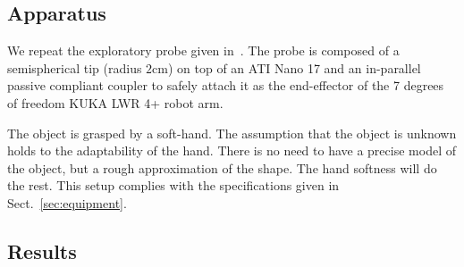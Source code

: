\subsection{Apparatus}
\label{sec:apparatus}

We repeat the exploratory probe given in~\citet{Rosales2014Active}. The probe is composed of a semispherical tip (radius $2$cm) on top of an ATI Nano 17 and an in-parallel passive compliant coupler to safely attach it as the end-effector of the 7 degrees of freedom KUKA LWR 4+ robot arm.

The object is grasped by a soft-hand. The 
assumption that the object is unknown holds to the adaptability of the hand.
There is no need to have a precise model of the object, but a rough 
approximation of the shape. The hand softness will do the rest. This setup
complies with the specifications given in Sect.~\ref{sec:equipment}.

\subsection{Results}
\label{sec:results}